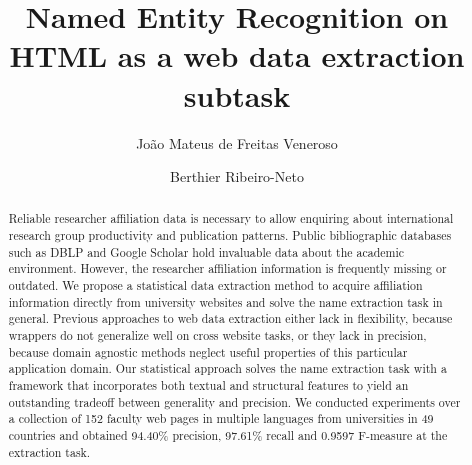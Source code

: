 \documentclass[sigconf]{acmart}
\begin{document}
\title{Named Entity Recognition on HTML as a web data extraction subtask}

\author{João Mateus de Freitas Veneroso}

\author{Berthier Ribeiro-Neto}

\begin{abstract}

Reliable researcher affiliation data is necessary to allow enquiring
about international research group productivity and publication patterns.
Public bibliographic databases such as DBLP and Google Scholar hold
invaluable data about the academic environment. However, the researcher
affiliation information is frequently missing or outdated.
We propose a statistical data extraction method to acquire affiliation 
information directly from university websites and solve the name extraction
task in general.
Previous approaches to web data extraction either lack in flexibility,
because wrappers do not generalize well on cross website tasks, or 
they lack in precision, because domain agnostic methods neglect 
useful properties of this particular application domain.
Our statistical approach solves the name extraction task with 
a framework that incorporates both textual and structural features to
yield an outstanding tradeoff between generality and precision. 
We conducted experiments over a collection of 152 faculty 
web pages in multiple languages from universities in 49 countries
and obtained 94.40\% precision, 97.61\% recall and 0.9597 F-measure at
the extraction task.


\end{abstract}


\maketitle

\end{document}
